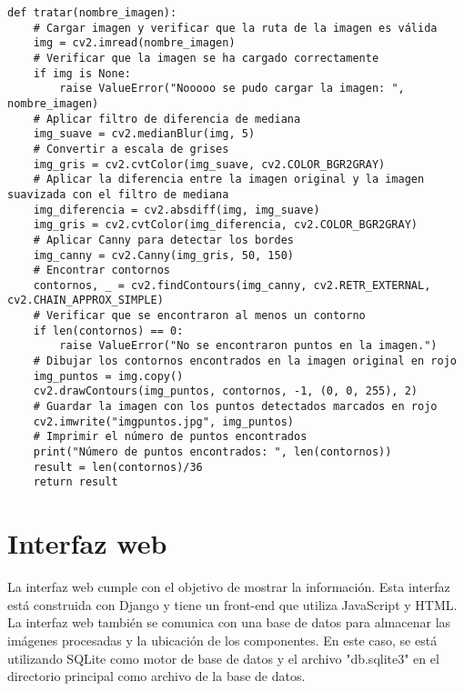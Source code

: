 \begin{lstlisting}[frame=single]
def tratar(nombre_imagen): 
    # Cargar imagen y verificar que la ruta de la imagen es válida 
    img = cv2.imread(nombre_imagen) 
    # Verificar que la imagen se ha cargado correctamente 
    if img is None:
        raise ValueError("Nooooo se pudo cargar la imagen: ", nombre_imagen)
    # Aplicar filtro de diferencia de mediana 
    img_suave = cv2.medianBlur(img, 5) 
    # Convertir a escala de grises 
    img_gris = cv2.cvtColor(img_suave, cv2.COLOR_BGR2GRAY) 
    # Aplicar la diferencia entre la imagen original y la imagen suavizada con el filtro de mediana 
    img_diferencia = cv2.absdiff(img, img_suave) 
    img_gris = cv2.cvtColor(img_diferencia, cv2.COLOR_BGR2GRAY) 
    # Aplicar Canny para detectar los bordes
    img_canny = cv2.Canny(img_gris, 50, 150) 
    # Encontrar contornos 
    contornos, _ = cv2.findContours(img_canny, cv2.RETR_EXTERNAL, cv2.CHAIN_APPROX_SIMPLE) 
    # Verificar que se encontraron al menos un contorno 
    if len(contornos) == 0:
        raise ValueError("No se encontraron puntos en la imagen.") 
    # Dibujar los contornos encontrados en la imagen original en rojo 
    img_puntos = img.copy() 
    cv2.drawContours(img_puntos, contornos, -1, (0, 0, 255), 2) 
    # Guardar la imagen con los puntos detectados marcados en rojo 
    cv2.imwrite("imgpuntos.jpg", img_puntos) 
    # Imprimir el número de puntos encontrados 
    print("Número de puntos encontrados: ", len(contornos)) 
    result = len(contornos)/36 
    return result

\end{lstlisting}
\clearpage
\section{Interfaz web}
La interfaz web cumple con el objetivo de mostrar la información. Esta interfaz está construida con Django y tiene un front-end que utiliza JavaScript y HTML. La interfaz web también se comunica con una base de datos para almacenar las imágenes procesadas y la ubicación de los componentes. En este caso, se está utilizando SQLite como motor de base de datos y el archivo "db.sqlite3" en el directorio principal como archivo de la base de datos.
